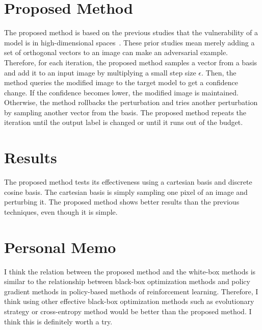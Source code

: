 \documentclass[10pt,twocolumn,letterpaper]{article}
\begin{document}
\section{Proposed Method}
The proposed method is based on the previous studies that the vulnerability of a model is in high-dimensional spaces~\cite{Inevit1, Inevit2}. These prior studies mean merely adding a set of orthogonal vectors to an image can make an adversarial example. Therefore, for each iteration, the proposed method samples a vector from a basis and add it to an input image by multiplying a small step size $\epsilon$. Then, the method queries the modified image to the target model to get a confidence change. If the confidence becomes lower, the modified image is maintained. Otherwise, the method rollbacks the perturbation and tries another perturbation by sampling another vector from the basis. The proposed method repeats the iteration until the output label is changed or until it runs out of the budget.

\section{Results}
The proposed method tests its effectiveness using a cartesian basis and discrete cosine basis. The cartesian basis is simply sampling one pixel of an image and perturbing it. The proposed method shows better results than the previous techniques, even though it is simple.

\section{Personal Memo}
I think the relation between the proposed method and the white-box methods is similar to the relationship between black-box optimization methods and policy gradient methods in policy-based methods of reinforcement learning. Therefore, I think using other effective black-box optimization methods such as evolutionary strategy or cross-entropy method would be better than the proposed method. I think this is definitely worth a try.


{\small


}
\end{document}

